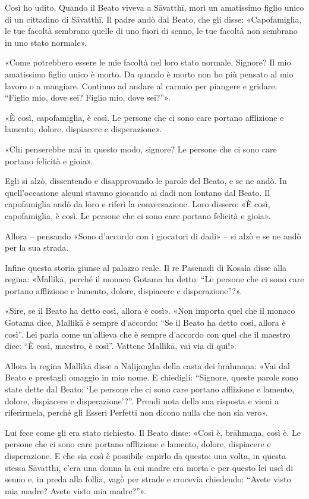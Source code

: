  Così ho udito. Quando il Beato viveva a Sāvatthī, morì un
amatissimo figlio unico di un cittadino di Sāvatthī. Il padre andò dal Beato,
che gli disse: «Capofamiglia, le tue facoltà sembrano quelle di uno fuori di
senno, le tue facoltà non sembrano in uno stato normale».

«Come potrebbero essere le mie facoltà nel loro stato normale, Signore? Il mio
amatissimo figlio unico è morto. Da quando è morto non ho più pensato al mio
lavoro o a mangiare. Continuo ad andare al carnaio per piangere e gridare:
“Figlio mio, dove sei? Figlio mio, dove sei?”».

«È così, capofamiglia, è così. Le persone che ci sono care portano afflizione e
lamento, dolore, dispiacere e disperazione».

«Chi penserebbe mai in questo modo, signore? Le persone che ci sono care portano
felicità e gioia».

Egli si alzò, dissentendo e disapprovando le parole del Beato, e se ne andò. In
quell’occasione alcuni stavano giocando ai dadi non lontano dal Beato. Il
capofamiglia andò da loro e riferì la conversazione. Loro dissero: «È così,
capofamiglia, è così. Le persone che ci sono care portano felicità e gioia».

Allora – pensando «Sono d’accordo con i giocatori di dadi» – si alzò e se ne
andò per la sua strada.

Infine questa storia giunse al palazzo reale. Il re Pasenadi di Kosala disse
alla regina: «Mallikā, perché il monaco Gotama ha detto: “Le persone che ci sono
care portano afflizione e lamento, dolore, dispiacere e disperazione”?».

«Sire, se il Beato ha detto così, allora è così». «Non importa quel che il
monaco Gotama dice, Mallikā è sempre d’accordo: “Se il Beato ha detto così,
allora è così”. Lei parla come un’allieva che è sempre d’accordo con quel che il
maestro dice: “È così, maestro, è così”. Vattene Mallikā, vai via di qui!».

Allora la regina Mallikā disse a Nāḷijangha della casta dei brāhmaṇa: «Vai dal
Beato e prestagli omaggio in mio nome. E chiedigli: “Signore, queste parole sono
state dette dal Beato: ‘Le persone che ci sono care portano afflizione e
lamento, dolore, dispiacere e disperazione’?”. Prendi nota della sua risposta e
vieni a riferirmela, perché gli Esseri Perfetti non dicono nulla che non sia
vero».

Lui fece come gli era stato richiesto. Il Beato disse: «Così è, brāhmaṇa, così
è. Le persone che ci sono care portano afflizione e lamento, dolore, dispiacere
e disperazione. E che sia così è possibile capirlo da questo: una volta, in
questa stessa Sāvatthī, c’era una donna la cui madre era morta e per questo lei
uscì di senno e, in preda alla follia, vagò per strade e crocevia chiedendo:
“Avete visto mia madre? Avete visto mia madre?”».

